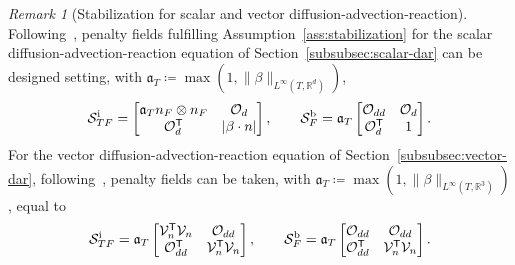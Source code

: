 \documentclass[11pt,a4paper]{article}
\theoremstyle{plain}
\theoremstyle{remark}
\newtheorem{remark}[theorem]{Remark}
\theoremstyle{definition}
\newcommand{\Real}{\mathbb{R}}
\newcommand{\Complex}{\mathbb{C}}
\newcommand{\trans}{\mathsf{T}}
\DeclareMathOperator{\Ker}{Ker}
\newcommand{\norm}[2]{\|#2\|_{#1}}
\newcommand{\Aref}[1][T]{\mathfrak{a}_{#1}}
\begin{document}

\begin{remark}[Stabilization for scalar and vector diffusion-advection-reaction]\label{rmk:penalty-fields}
  Following~\cite[Example~60.14]{Ern.Guermond:21*2}, penalty fields fulfilling Assumption~\ref{ass:stabilization} for the scalar diffusion-advection-reaction equation of Section~\ref{subsubsec:scalar-dar} can be designed setting, with $\Aref[T] \coloneqq \max(1, \|\beta\|_{L^\infty(T, \Real^d)})$,
  \[
  \mathcal{S}_{TF}^{\rm i} =
  \begin{bmatrix}
    \Aref[T] n_F\otimes n_F & \mathcal{O}_{d}
    \\
    \mathcal{O}_{d}^\trans & |\beta\cdot n|
  \end{bmatrix}
  ,
  \qquad
  \mathcal{S}_{F}^{\rm b} = \Aref[T]
  \begin{bmatrix}
    \mathcal{O}_{d d} & \mathcal{O}_{d}
    \\
    \mathcal{O}_{d}^\trans & 1
  \end{bmatrix}.
  \]
  For the vector diffusion-advection-reaction equation of Section~\ref{subsubsec:vector-dar}, following~\cite[Example 60.15]{Ern.Guermond:21*2}, penalty fields can be taken, with $\Aref[T] \coloneqq \max(1, \norm{L^\infty(T, \Real^3)}{\beta})$, equal to
  \[
  \mathcal{S}_{TF}^{\rm i} = \Aref[T]
  \begin{bmatrix}
    \mathcal{V}_n^\trans \mathcal{V}_n & \mathcal{O}_{dd}
    \\
    \mathcal{O}_{dd}^\trans & \mathcal{V}_n^\trans\mathcal{V}_n
  \end{bmatrix}
  ,
  \qquad
  \mathcal{S}_{F}^{\rm b} = \Aref[T]
  \begin{bmatrix}
    \mathcal{O}_{d d} & \mathcal{O}_{dd}
    \\
    \mathcal{O}_{dd}^\trans & \mathcal{V}_n^\trans\mathcal{V}_n
  \end{bmatrix}.
  \]
\end{remark}
\end{document}
